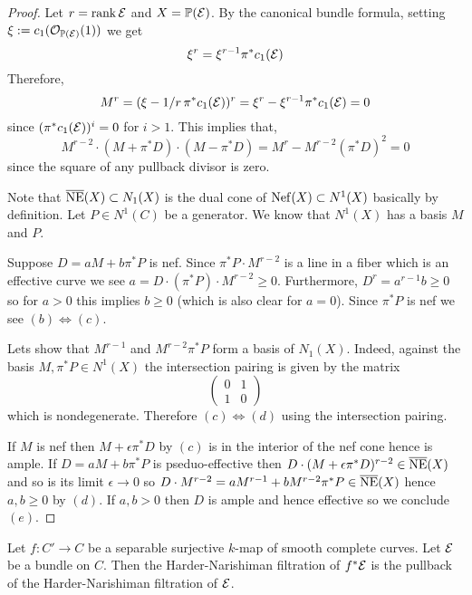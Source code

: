\documentclass[12pt]{article}
\begin{document}
\begin{proof}
Let $r = \operatorname{\mathrm{rank}}{\mathcal{E}}$ and $X = \mathbb{P}(\mathcal{E})$. 
By the canonical bundle formula, setting $\xi := c_1(\mathcal{O}_{\mathbb{P}(\mathcal{E})}(1))$ we get
\[ \xi^{r} = \xi^{r-1} \pi^* c_1(\mathcal{E}) \]
Therefore,
\[ M^r = (\xi - 1/r \, \pi^* c_1(\mathcal{E}))^r = \xi^r - \xi^{r-1} \pi^* c_1(\mathcal{E}) = 0 \]
since $(\pi^* c_1(\mathcal{E}))^i = 0$ for $i > 1$. This implies that,
\[ M^{r-2} \cdot (M + \pi^* D) \cdot (M - \pi^* D) = M^r - M^{r-2} (\pi^* D)^2 = 0 \]
since the square of any pullback divisor is zero.


Note that $\overline{\mathrm{NE}}(X) \subset N_1(X)$ is the dual cone of $\mathrm{Nef}(X) \subset N^1(X)$ basically by definition. Let $P \in N^1(C)$ be a generator. We know that $N^1(X)$ has a basis $M$ and $P$.

Suppose $D = a M + b \pi^* P$ is nef. Since $\pi^* P \cdot M^{r-2}$ is a line in a fiber which is an effective curve we see $a = D \cdot (\pi^* P) \cdot M^{r-2} \ge 0$. Furthermore, $D^r = a^{r-1} b \ge 0$ so for $a > 0$ this implies $b \ge 0$ (which is also clear for $a = 0$). Since $\pi^* P$ is nef we see $(b) \iff (c)$.


Lets show that $M^{r-1}$ and $M^{r-2} \pi^* P$ form a basis of $N_1(X)$. Indeed, against the basis $M, \pi^*P \in N^1(X)$ the intersection pairing is given by the matrix
\[ 
\begin{pmatrix}
0 & 1
\\
1 & 0
\end{pmatrix} \]
which is nondegenerate. Therefore $(c) \iff (d)$ using the intersection pairing. 


If $M$ is nef then $M + \epsilon \pi^* D$ by $(c)$ is in the interior of the nef cone hence is ample. If $D = a M + b \pi^* P$ is pseduo-effective then $D \cdot (M + \epsilon \pi^* D)^{r-2} \in \overline{\mathrm{NE}}(X)$ and so is its limit $\epsilon \to 0$ so $D \cdot M^{r-2} = a M^{r-1} + b M^{r-2} \pi^* P \in \overline{\mathrm{NE}}(X)$ hence $a, b \ge 0$ by $(d)$. If $a, b > 0$ then $D$ is ample and hence effective so we conclude $(e)$. 

\end{proof}

\begin{lemma}
Let $f : C' \to C$ be a separable surjective $k$-map of smooth complete curves. Let $\mathcal{E}$ be a bundle on $C$. Then the Harder-Narishiman filtration of $f^* \mathcal{E}$ is the pullback of the Harder-Narishiman filtration of $\mathcal{E}$.
\end{lemma}
\end{document}

